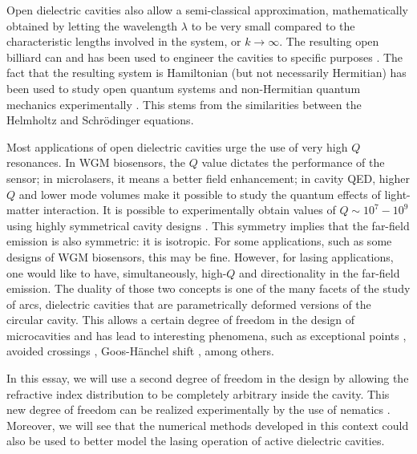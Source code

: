 Open dielectric cavities also allow a semi-classical approximation, mathematically
obtained by letting the wavelength $\lambda$ to be very small compared to 
the characteristic lengths involved in the system, or $k\rightarrow\infty$. 
The resulting open billiard can and has been used to engineer the cavities
to specific purposes \cite{KIM2013} . The fact
that the resulting system is Hamiltonian (but not necessarily Hermitian) 
has been used to study open quantum systems and non-Hermitian quantum 
mechanics experimentally \cite{BIT2010}. This stems from the similarities between the
Helmholtz and Schrödinger equations. 

Most applications of open dielectric cavities urge the use of very high $Q$
resonances. In WGM biosensors, the $Q$ value dictates the performance
of the sensor; in microlasers, it means a better field enhancement; in cavity
QED, higher $Q$ and lower mode volumes make it possible to study the quantum 
effects of light-matter interaction. It is possible to experimentally obtain
values of $Q\sim10^7-10^9$ using highly symmetrical cavity designs \cite{ARM2003,ARM2007,WAR2011}.
This symmetry implies that the far-field emission is also symmetric: it is
isotropic. For some applications, such as some designs of WGM biosensors, this may be
fine. However, for lasing applications, one would like to have, simultaneously, 
high-$Q$ and directionality in the far-field emission. The duality of those 
two concepts is one of the many facets of the study of \glspl{arc}, dielectric
cavities that are parametrically deformed versions of the circular cavity. 
This allows a certain degree of freedom in the design of microcavities and has
lead to interesting phenomena, such as exceptional points \cite{DET2009,RYU2009,HEI2012,BIT2014}, 
avoided crossings \cite{SON2013}, Goos-Hänchel shift \cite{UNT2008}, among others.

In this essay, we will use a second degree of freedom in the design
by allowing the refractive index distribution to be completely
arbitrary inside the cavity. This new degree of freedom can be realized
experimentally by the use of nematics \cite{PTA2013}. 
Moreover, we will see that the numerical
methods developed in this context could also be used to better model the lasing 
operation of active dielectric cavities.

